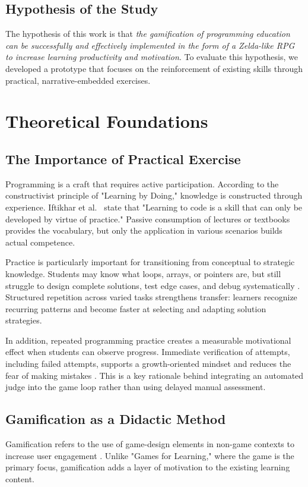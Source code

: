 \documentclass[a4paper, UKenglish, cleveref, autoref, thm-restate]{oasics-v2021}
\begin{document}
\subsection{Hypothesis of the Study}
The hypothesis of this work is that \textit{the gamification of programming education can be successfully and effectively implemented in the form of a Zelda-like RPG to increase learning productivity and motivation}. To evaluate this hypothesis, we developed a prototype that focuses on the reinforcement of existing skills through practical, narrative-embedded exercises.

\section{Theoretical Foundations}
\subsection{The Importance of Practical Exercise}
Programming is a craft that requires active participation. According to the constructivist principle of "Learning by Doing," knowledge is constructed through experience. Iftikhar et al.~\cite{iftikhar2022practice} state that "Learning to code is a skill that can only be developed by virtue of practice." Passive consumption of lectures or textbooks provides the vocabulary, but only the application in various scenarios builds actual competence.

Practice is particularly important for transitioning from conceptual to strategic knowledge. Students may know what loops, arrays, or pointers are, but still struggle to design complete solutions, test edge cases, and debug systematically \cite{medeiros2019review}. Structured repetition across varied tasks strengthens transfer: learners recognize recurring patterns and become faster at selecting and adapting solution strategies.

In addition, repeated programming practice creates a measurable motivational effect when students can observe progress. Immediate verification of attempts, including failed attempts, supports a growth-oriented mindset and reduces the fear of making mistakes \cite{marwan2022feedback}. This is a key rationale behind integrating an automated judge into the game loop rather than using delayed manual assessment.

\subsection{Gamification as a Didactic Method}
Gamification refers to the use of game-design elements in non-game contexts to increase user engagement \cite{smiderle2020impact}. Unlike "Games for Learning," where the game is the primary focus, gamification adds a layer of motivation to the existing learning content.
\end{document}
